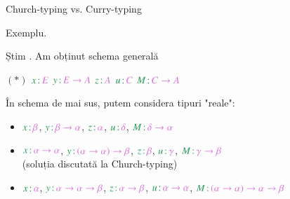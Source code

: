 \documentclass[xcolor=pdftex,romanian,colorlinks]{beamer}
\begin{document}
\begin{frame}{Church-typing vs. Curry-typing}

{\color{True} Exemplu.}

Știm . Am obținut schema generală
\vspace{-.2cm}
\begin{center}
$(*)$ \hspace{.3cm}
{\color{True}$\type{x}{E}$} \hspace{.3cm}
{\color{True}$\type{y}{E \to A}$}  \hspace{.3cm}
{\color{True}$\type{z}{A}$}  \hspace{.3cm}
{\color{True}$\type{u}{C}$} \hspace{.3cm}
{\color{True}$\type{M}{C \to A}$}
\end{center}
\vspace{-.2cm}

În schema de mai sus, putem considera tipuri "reale":
\begin{itemize}
	\item {\color{True}$\type{x}{\beta}$}, \hspace{.1cm}
{\color{True}$\type{y}{\beta \to \alpha}$},  \hspace{.1cm}
{\color{True}$\type{z}{\alpha}$},  \hspace{.1cm}
{\color{True}$\type{u}{\delta}$}, \hspace{.1cm}
{\color{True}$\type{M}{\delta \to \alpha}$}
\pause
	\item {\color{True}$\type{x}{\alpha \to \alpha}$}, \hspace{.1cm}
{\color{True}$\type{y}{(\alpha \to \alpha) \to \beta}$},  \hspace{.1cm}
{\color{True}$\type{z}{\beta}$},  \hspace{.1cm}
{\color{True}$\type{u}{\gamma}$}, \hspace{.1cm}
{\color{True}$\type{M}{\gamma \to \beta}$} \\
(soluția discutată la Church-typing)
\pause
	\item {\color{True}$\type{x}{\alpha}$}, \hspace{.1cm}
{\color{True}$\type{y}{\alpha \to \alpha \to \beta}$},  \hspace{.1cm}
{\color{True}$\type{z}{\alpha \to \beta}$},  \hspace{.1cm}
{\color{True}$\type{u}{\alpha \to \alpha}$}, \hspace{.1cm}
{\color{True}$\type{M}{(\alpha \to \alpha) \to \alpha \to \beta}$} \\
\end{itemize}
\end{frame}
\end{document}
